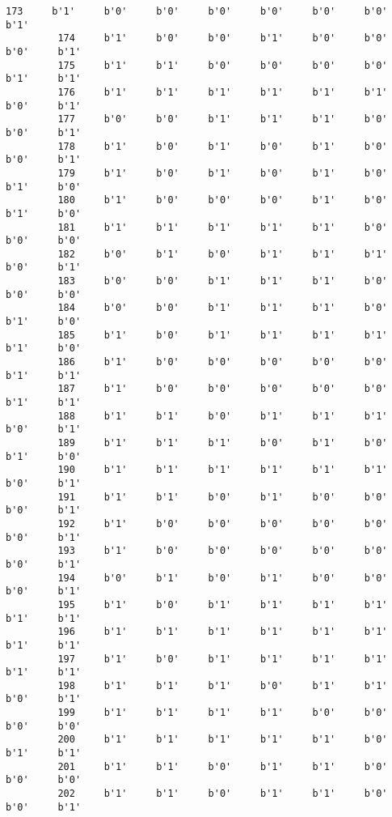 \documentclass[11pt]{article}
\begin{document}
\begin{Verbatim}[commandchars=\\\{\}]
         173     b'1'     b'0'     b'0'     b'0'     b'0'     b'0'     b'0'     b'1'   
         174     b'1'     b'0'     b'0'     b'1'     b'0'     b'0'     b'0'     b'1'   
         175     b'1'     b'1'     b'0'     b'0'     b'0'     b'0'     b'1'     b'1'   
         176     b'1'     b'1'     b'1'     b'1'     b'1'     b'1'     b'0'     b'1'   
         177     b'0'     b'0'     b'1'     b'1'     b'1'     b'0'     b'0'     b'1'   
         178     b'1'     b'0'     b'1'     b'0'     b'1'     b'0'     b'0'     b'1'   
         179     b'1'     b'0'     b'1'     b'0'     b'1'     b'0'     b'1'     b'0'   
         180     b'1'     b'0'     b'0'     b'0'     b'1'     b'0'     b'1'     b'0'   
         181     b'1'     b'1'     b'1'     b'1'     b'1'     b'0'     b'0'     b'0'   
         182     b'0'     b'1'     b'0'     b'1'     b'1'     b'1'     b'0'     b'1'   
         183     b'0'     b'0'     b'1'     b'1'     b'1'     b'0'     b'0'     b'0'   
         184     b'0'     b'0'     b'1'     b'1'     b'1'     b'0'     b'1'     b'0'   
         185     b'1'     b'0'     b'1'     b'1'     b'1'     b'1'     b'1'     b'0'   
         186     b'1'     b'0'     b'0'     b'0'     b'0'     b'0'     b'1'     b'1'   
         187     b'1'     b'0'     b'0'     b'0'     b'0'     b'0'     b'1'     b'1'   
         188     b'1'     b'1'     b'0'     b'1'     b'1'     b'1'     b'0'     b'1'   
         189     b'1'     b'1'     b'1'     b'0'     b'1'     b'0'     b'1'     b'0'   
         190     b'1'     b'1'     b'1'     b'1'     b'1'     b'1'     b'0'     b'1'   
         191     b'1'     b'1'     b'0'     b'1'     b'0'     b'0'     b'0'     b'1'   
         192     b'1'     b'0'     b'0'     b'0'     b'0'     b'0'     b'0'     b'1'   
         193     b'1'     b'0'     b'0'     b'0'     b'0'     b'0'     b'0'     b'1'   
         194     b'0'     b'1'     b'0'     b'1'     b'0'     b'0'     b'0'     b'1'   
         195     b'1'     b'0'     b'1'     b'1'     b'1'     b'1'     b'1'     b'1'   
         196     b'1'     b'1'     b'1'     b'1'     b'1'     b'1'     b'1'     b'1'   
         197     b'1'     b'0'     b'1'     b'1'     b'1'     b'1'     b'1'     b'1'   
         198     b'1'     b'1'     b'1'     b'0'     b'1'     b'1'     b'0'     b'1'   
         199     b'1'     b'1'     b'1'     b'1'     b'0'     b'0'     b'0'     b'0'   
         200     b'1'     b'1'     b'1'     b'1'     b'1'     b'0'     b'1'     b'1'   
         201     b'1'     b'1'     b'0'     b'1'     b'1'     b'0'     b'0'     b'0'   
         202     b'1'     b'1'     b'0'     b'1'     b'1'     b'0'     b'0'     b'1'   

\end{Verbatim}
\end{document}
